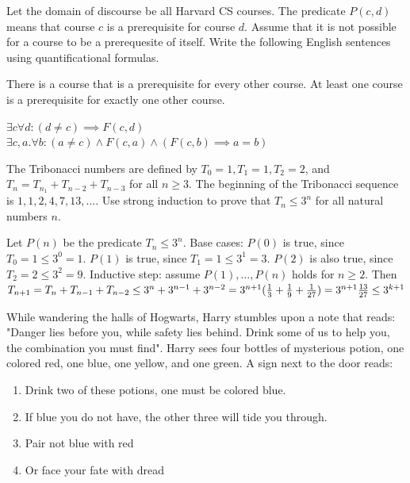 \documentclass[solution, letterpaper]{cs20exam}
\begin{document}
\problem{}{} Let the domain of discourse be all Harvard CS courses. The predicate $P(c, d)$ means that course $c$ is a prerequisite for course $d$. Assume that it is not possible for a course to be a prerequesite of itself. Write the following English sentences using quantificational formulas.

\subproblem There is a course that is a prerequisite for every other course.
\subproblem At least one course is a prerequisite for exactly one other course.

\begin{solution}
\subsolution $\exists c \forall d: (d \neq c) \implies F(c,d)$
\subsolution $\exists c, a . \forall b : (a \neq c) \land F(c, a) \land (F(c, b) \implies a = b)$

\end{solution}

\problem{}{} The Tribonacci numbers are defined by $T_0 = 1, T_1 = 1, T_2 = 2$, and $T_n = T_{n_1} + T_{n-2} + T_{n-3}$ for all $n \ge 3$. The beginning of the Tribonacci sequence is $1, 1, 2, 4, 7, 13, ...$. Use strong induction to prove that $T_n \le 3^n$ for all natural numbers $n$.

\begin{solution}
Let $P(n)$ be the predicate $T_n \le 3^n$. Base cases: $P(0)$ is true, since $T_0 = 1 \le 3^0 = 1$. $P(1)$ is true, since $T_1 = 1 \le 3^1 = 3$. $P(2)$ is also true, since $T_2 = 2 \le 3^2 = 9$. Inductive step: assume $P(1), ..., P(n)$ holds for $n \ge 2$. Then 
\begin{math}
T_{n+1} = T_n + T_{n-1} + T_{n-2}
\\ \le 3^n + 3^{n-1} + 3^{n-2}
\\ = 3^{n+1}(\frac{1}{3} + \frac{1}{9} + \frac{1}{27})
\\ = 3^{n+1}\frac{13}{27}
\\ \le 3^{k+1}
\end{math}
\end{solution}

\problem{}{}

While wandering the halls of Hogwarts, Harry stumbles upon a note that reads: "Danger lies before you, while safety lies behind. Drink some of us to help you, the combination you must find". Harry sees four bottles of mysterious potion, one colored red, one blue, one yellow, and one green. A sign next to the door reads:

\begin{enumerate}
\item Drink two of these potions, one must be colored blue.
\item If blue you do not have, the other three will tide you through.
\item Pair not blue with red
\item Or face your fate with dread
\end{enumerate}
\end{document}
